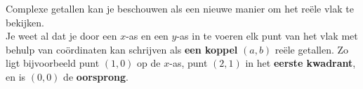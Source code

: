 \documentclass{ximera}
\begin{document}
	\author{Zomercursus KU Leuven}
	
	\label{xim:complexe_getallen_meetkundif}




Complexe getallen kan je beschouwen als een nieuwe manier om het reële vlak te bekijken. 
\\
Je weet al dat je door een $x$-as en een $y$-as in te voeren 
elk punt van het vlak met behulp van coördinaten kan schrijven als \textbf{een koppel} \((a,b)\) reële getallen.
Zo ligt bijvoorbeeld punt \((1,0)\) op de $x$-as, punt \((2,1)\) in het \textbf{eerste kwadrant}, en is \((0,0)\) de \textbf{oorsprong}.



\end{document}
